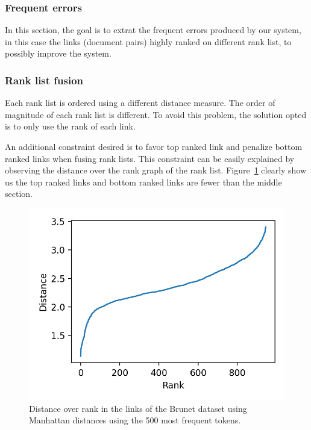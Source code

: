 \subsubsection{Frequent errors}

In this section, the goal is to extrat the frequent errors produced by our system, in this case the links (document pairs) highly ranked on different rank list, to possibly improve the system.




\subsubsection{Rank list fusion}

Each rank list is ordered using a different distance measure.
The order of magnitude of each rank list is different.
To avoid this problem, the solution opted is to only use the rank of each link.

An additional constraint desired is to favor top ranked link and penalize bottom ranked links when fusing rank lists.
This constraint can be easily explained by observing the distance over the rank graph of the rank list.
Figure~\ref{fig:distance_over_rank} clearly show us the top ranked links and bottom ranked links are fewer than the middle section.

\begin{figure}
  \includegraphics[width=\linewidth]{img/distance_over_rank.png}
  \caption{Distance over rank in the links of the Brunet dataset using Manhattan distances using the 500 most frequent tokens.}
  \label{fig:distance_over_rank}
\end{figure}

